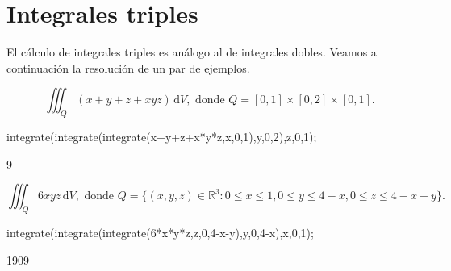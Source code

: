 
\section{Integrales triples}
El cálculo de integrales triples es análogo al de
integrales dobles. Veamos a continuación la resolución
de un par de ejemplos.

\begin{equation*}
 \iiint_{Q} (x+y+z+xyz)\,\mathrm{d}V,
 \text{ donde }
 Q = [0,1]\times[0,2]\times[0,1].
\end{equation*}
\begin{maximai}
 integrate(integrate(integrate(x+y+z+x*y*z,x,0,1),y,0,2),z,0,1);
\end{maximai}\begin{maximao}
 {{9}}
\end{maximao}

\begin{equation*}
 \iiint_{Q} 6xyz\,\mathrm{d}V,
 \text{ donde }
 Q = \{(x,y,z)\in\mathbb{R}^3 : 0\leq x\leq 1, 0\leq y\leq 4-x,
 0\leq z\leq 4-x-y\}.
\end{equation*}
\begin{maximai}
 integrate(integrate(integrate(6*x*y*z,z,0,4-x-y),y,0,4-x),x,0,1);
\end{maximai}\begin{maximao}
 {{1909}}
\end{maximao}
